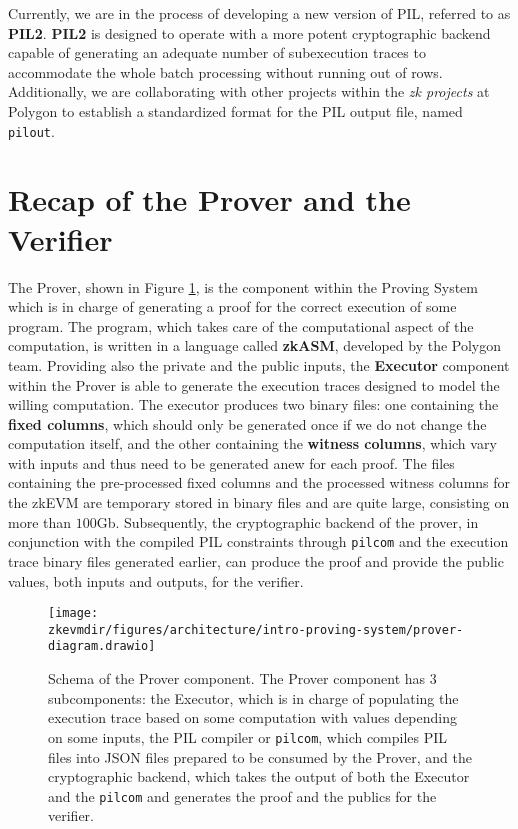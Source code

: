 Currently, we are in the process of developing a new version of PIL, referred to as \textbf{PIL2}. \textbf{PIL2} is designed to operate with a more potent cryptographic backend capable of generating an adequate number of subexecution traces to accommodate the whole batch processing without running out of rows. Additionally, we are collaborating with other projects within the \textit{zk projects} at Polygon to establish a standardized format for the PIL output file, named \texttt{pilout}.



\section{Recap of the Prover and the Verifier}

The Prover, shown in Figure \ref{fig:prover-diagram}, is the component within the Proving System which is in charge of generating a proof for the correct execution of some program. The program, which takes care of the computational aspect of the computation, is written in a language called \textbf{zkASM}, developed by the Polygon team. Providing also the private and the public inputs, the \textbf{Executor} component within the Prover is able to generate the execution traces designed to model the willing computation. The executor produces two binary files: one containing the \textbf{fixed columns}, which should only be generated once if we do not change the computation itself, and the other containing the \textbf{witness columns}, which vary with inputs and thus need to be generated anew for each proof. The files containing the pre-processed fixed columns and the processed witness columns for the zkEVM are temporary stored in binary files and are quite large, consisting on more than $100$Gb. Subsequently, the cryptographic backend of the prover, in conjunction with the compiled PIL constraints through \texttt{pilcom} and the execution trace binary files generated earlier, can produce the proof and provide the public values, both inputs and outputs, for the verifier.

\begin{figure}[H]
\centering
\texttt{[image: \\zkevmdir/figures/architecture/intro-proving-system/prover-diagram.drawio]}
\caption{Schema of the Prover component. The Prover component has $3$ subcomponents: the Executor, which is in charge of populating the execution trace based on some computation with values depending on some inputs, the PIL compiler or \texttt{pilcom}, which compiles PIL files into JSON files prepared to be consumed by the Prover, and the cryptographic backend, which takes the output of both the Executor and the \texttt{pilcom} and generates the proof and the publics for the verifier. }
\label{fig:prover-diagram}
\end{figure}

